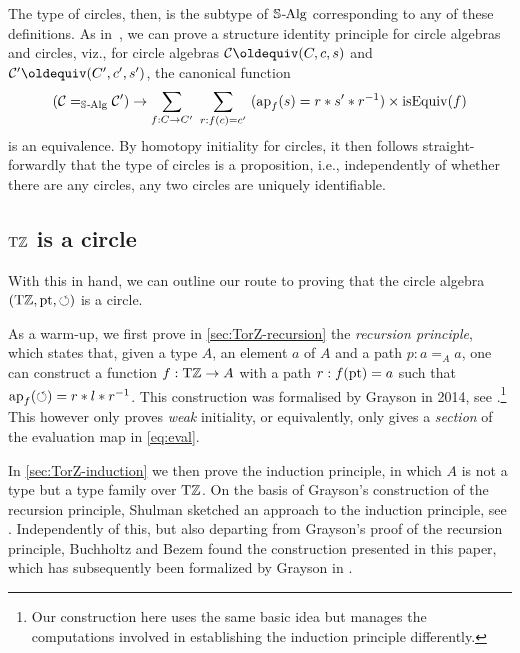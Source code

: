 \documentclass[a4paper,12pt]{amsart}
\begin{document}
The type of circles, then, is the subtype of $\mathord{\mathbb{S}\textup{\kern.5pt-\kern-.5pt}\mathrm{Alg}}$
corresponding to any of these definitions.
As in~\cite[Sec.~9.8]{hottbook},
we can prove a structure identity principle for circle algebras and circles,
viz., for circle algebras $\mathcal C\jdeq(C,c,s)$ and
$\mathcal C'\jdeq(C',c',s')$, the canonical function
\[
  (\mathcal C =_{\mathord{\mathbb{S}\textup{\kern.5pt-\kern-.5pt}\mathrm{Alg}}} \mathcal C')
  \to
  \sum_{f : C \to C'}~\sum_{r:f(c)=c'}~(\mathop{{\mathrm{ap}}_{f}}(s)=r * s' * r^{-1})
  \times \mathrm{isEquiv}(f)
\]
is an equivalence.
By homotopy initiality for circles,
it then follows straight-forwardly that the type of circles
is a proposition, i.e.,
independently of whether there are any circles,
any two circles are uniquely identifiable.

\subsection{${\mathrm{T}\mathbb{Z}}$ is a circle}\label{sec:TorZ-circle}

With this in hand, we can outline our route to proving
that the circle algebra $({\mathrm{T}\mathbb{Z}},{\mathord{\mathrm{pt}}},{\circlearrowleft})$ is a circle.

As a warm-up, we first prove in \cref{sec:TorZ-recursion}
the \emph{recursion principle},
which states that, given a type $A$, an element $a$ of $A$ and a
path $p:a=_A a$, one can construct a function $f:{\mathrm{T}\mathbb{Z}}\to A$
with a path $r:f({\mathord{\mathrm{pt}}})=a$ such that $\mathop{{\mathrm{ap}}_{f}}({\circlearrowleft})=r * l * r^{-1}$.
This construction was formalised by Grayson
in 2014, see \cite[\href{https://github.com/UniMath/UniMath/blob/master/UniMath/SyntheticHomotopyTheory/Circle.v}{Circle.v}]{UniMath}.\footnote{Our construction here uses the
same basic idea but manages the computations involved in establishing the
induction principle differently.}
This however only proves \emph{weak} initiality, or equivalently,
only gives a \emph{section} of the evaluation map in \eqref{eq:eval}.

In \cref{sec:TorZ-induction} we then prove the induction principle,
in which $A$ is not a type but a type family over ${\mathrm{T}\mathbb{Z}}$.
On the basis of Grayson's construction of the recursion principle,
Shulman sketched an approach to the induction principle, see \cite{circleind-Mike}.
Independently of this, but also departing from Grayson's proof of the
recursion principle, Buchholtz and Bezem found the construction
presented in this paper, which has subsequently been formalized
by Grayson \cite[\href{https://github.com/UniMath/UniMath/blob/d5e570/UniMath/SyntheticHomotopyTheory/Circle2.v\#L268}{Circle2.v, commit d5e570, line 268}]{UniMath} in \UniMath.
\end{document}
